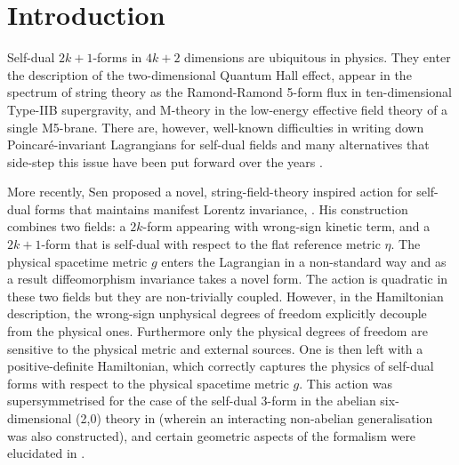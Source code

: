 \documentclass[11pt]{article}
\numberwithin{equation}{section}
\begin{document}
\section{Introduction}

Self-dual  $2k+1$-forms in $4k+2$ dimensions are ubiquitous in physics. They enter the description of the two-dimensional Quantum Hall effect, appear in the spectrum of string theory as the  Ramond-Ramond 5-form flux in ten-dimensional Type-IIB supergravity, and M-theory in the low-energy effective field theory of a single M5-brane. There are, however, well-known difficulties in writing down Poincaré-invariant Lagrangians for self-dual fields and many alternatives that side-step this issue have been put forward over the years \cite{Siegel:1983es,Floreanini:1987as,Imbimbo:1987yt,Bernstein:1988zd,Henneaux:1988gg,McClain:1990sx,Pasti:1995tn,Pasti:1995us,Perry:1996mk,Pasti:1996vs,Pasti:1997gx,Aganagic:1997zq,Witten:1997sc,Witten:1999vg,Belov:2006jd,Mkrtchyan:2019opf}.

More recently, Sen proposed a novel, string-field-theory inspired action for self-dual forms that maintains manifest Lorentz invariance, \cite{Sen:2015nph,Sen:2019qit}. His construction combines two fields: a $2k$-form appearing with wrong-sign kinetic term, and a $2k+1$-form that is self-dual with respect to the flat reference metric $\eta$. The physical spacetime metric $g$ enters the Lagrangian in a non-standard way and as a result diffeomorphism invariance takes a novel form. The action is quadratic in these two fields but they are non-trivially coupled. However, in the Hamiltonian description, the wrong-sign unphysical degrees of freedom explicitly decouple from the physical ones. Furthermore only the physical degrees of freedom are sensitive to the physical metric and external sources. One is then left with a positive-definite Hamiltonian, which correctly captures the physics of self-dual forms with respect to the physical  spacetime metric $g$. This action was supersymmetrised for the case of the self-dual 3-form in the abelian six-dimensional (2,0) theory in \cite{Lambert:2019diy} (wherein an interacting non-abelian generalisation was also constructed), and certain geometric aspects of the formalism were elucidated in \cite{Andriolo:2020ykk}. 
\end{document}
